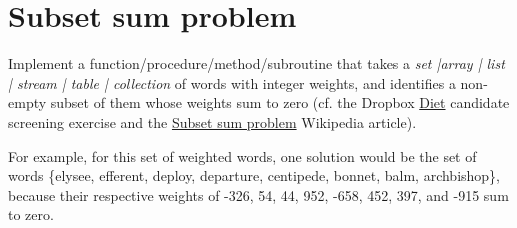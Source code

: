 \pagebreak{}
\section*{Subset sum problem}

Implement a function/procedure/method/subroutine that takes a
\emph{set |array | list | stream | table | collection} of words with
integer weights, and identifies a non-empty subset of them whose
weights sum to zero (cf. the Dropbox
\href{http://www.dropbox.com/jobs/challenges}{Diet} candidate
screening exercise and the
\href{http://en.wikipedia.org/wiki/Subset\_sum\_problem}{Subset sum
  problem} Wikipedia article).

For example, for this set of weighted words, one solution would be the
set of words \{elysee, efferent, deploy, departure, centipede, bonnet,
balm, archbishop\}, because their respective weights of -326, 54, 44,
952, -658, 452, 397, and -915 sum to zero.

